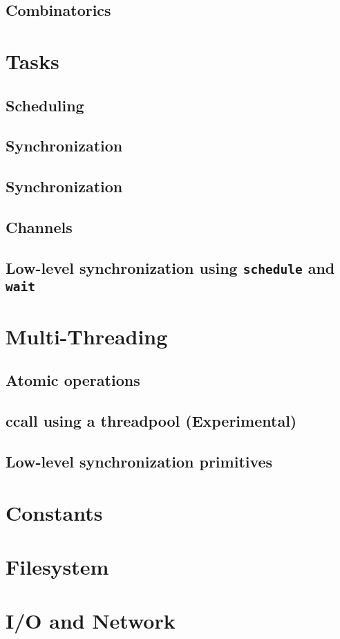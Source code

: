     \section{Combinatorics}
\chapter{Tasks}
    \section{Scheduling}
    \section{Synchronization}
    \section{Synchronization}
    \section{Channels}
    \section{Low-level synchronization using \texttt{schedule} and \texttt{wait}}
\chapter{Multi-Threading}
    \section{Atomic operations}
    \section{ccall using a threadpool (Experimental)}
    \section{Low-level synchronization primitives}
\chapter{Constants}
\chapter{Filesystem}
\chapter{I/O and Network}
